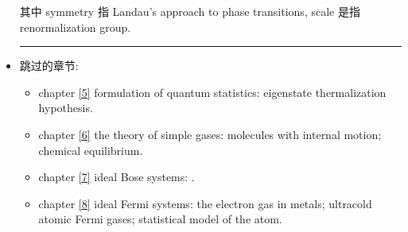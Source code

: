 \begin{itemize}
	其中 symmetry 指 Landau's approach to phase transitions, scale 是指 renormalization group.
	
	\noindent\rule[0.5ex]{\linewidth}{0.5pt} %
	
	\item 跳过的章节:
	\begin{itemize}
		\item chapter \ref{5} formulation of quantum statistics: eigenstate thermalization hypothesis.
		
		\item chapter \ref{6} the theory of simple gases: molecules with internal motion; chemical equilibrium.
		
		\item chapter \ref{7} ideal Bose systems: .
		
		\item chapter \ref{8} ideal Fermi systems: the electron gas in metals; ultracold atomic Fermi gases; statistical model of the atom.
	\end{itemize}
\end{itemize}
